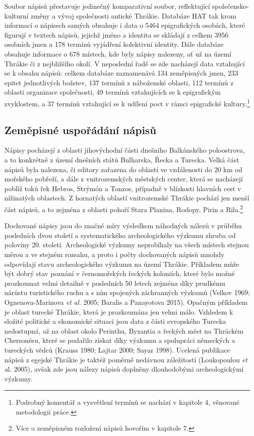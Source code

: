 Soubor nápisů přestavuje jedinečný komparativní soubor, reflektující společensko-kulturní změny a vývoj společnosti antické Thrákie. Databáze HAT tak krom informací o nápisech samých obsahuje i data o 5464 epigrafických osobách, které figurují v textech nápisů, jejichž jméno a identita se skládají z celkem 3956 osobních jmen a 178 termínů vyjádření kolektivní identity. Dále databáze obsahuje informace o 678 místech, kde byly nápisy nalezeny, ať už na území Thrákie či z nejbližšího okolí. V neposlední řadě se zde nacházejí data vztahující se k obsahu nápisů: celkem databáze zaznamenává 134 zeměpisných jmen, 233 epitet jednotlivých božstev, 137 termínů z náboženské oblasti, 112 termínů z oblasti organizace společnosti, 49 termínů vztahujících se k epigrafickým zvyklostem, a 37 termínů vztahující se k udílení poct v rámci epigrafické kultury.\footnote{Podrobný komentář a vysvětlení termínů se nachází v kapitole 4, věnované metodologii práce.}

\subsection[zeměpisné-uspořádání-nápisů]{Zeměpisné uspořádání nápisů}

Nápisy pocházejí z oblasti jihovýchodní části dnešního Balkánského poloostrova, a to konkrétně z území dnešních států Bulharska, Řecka a Turecka. Velká část nápisů byla nalezena, či editory zařazena do oblastí ve vzdálenosti do 20 km od mořského pobřeží, a dále z vnitrozemských městských center, která se nacházejí poblíž toků řek Hebros, Strýmón a Tonzos, případně v blízkosti hlavních cest v nížinatých oblastech. Z hornatých oblastí vnitrozemské Thrákie pochází jen menší část nápisů, a to zejména z oblasti pohoří Stara Planina, Rodopy, Pirin a Rila.\footnote{Více o zeměpisném rozložení nápisů hovořím v kapitole 7.}

Dochované nápisy jsou do značné míry výsledkem náhodných nálezů v průběhu posledních dvou století a systematického archeologického výzkumu zhruba od poloviny 20. století. Archeologické výzkumy neprobíhaly na všech místech stejnou měrou a ve stejném rozsahu, a proto i počty dochovaných nápisů mnohdy odpovídají stavu archeologického výzkumu na území Thrákie. Příkladem může být dobrý stav poznání v černomořských řeckých koloniích, které bylo možné prozkoumat velmi detailně v posledních 50 letech zejména díky prudkému nárůstu turistického ruchu a s ním spojených záchranných výzkumů (Velkov 1969; Ognenova-Marinova {\em et al.} 2005; Baralis a Panayotova 2015). Opačným příkladem je oblast turecké Thrákie, která je prozkoumána jen velmi málo. Vzhledem k složité politické a ekonomické situaci jsou data z části evropského Turecka nedostupná, až na oblast okolo Perinthu, Byzantia a řeckých měst na Thráckém Chersonésu, které se podařilo získat díky výzkumu a spolupráci německých a tureckých vědců (Krauss 1980; Lajtar 2000; Sayar 1998). Ucelená publikace nápisů z egejské Thrákie je taktéž poměrně nedávnou záležitostí (Loukopoulou {\em et a}l. 2005), avšak zde jsou nálezy nápisů doplněny dlouhodobými archeologickými výzkumy.

